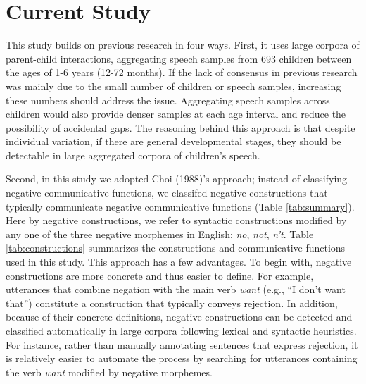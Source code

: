 \documentclass[
  man,floatsintext]{apa6}
\begin{document}
\hypertarget{current-study}{%
\section{Current Study}\label{current-study}}

This study builds on previous research in four ways. First, it uses large corpora of parent-child interactions, aggregating speech samples from 693 children between the ages of 1-6 years (12-72 months). If the lack of consensus in previous research was mainly due to the small number of children or speech samples, increasing these numbers should address the issue. Aggregating speech samples across children would also provide denser samples at each age interval and reduce the possibility of accidental gaps. The reasoning behind this approach is that despite individual variation, if there are general developmental stages, they should be detectable in large aggregated corpora of children's speech.

Second, in this study we adopted Choi (1988)'s approach; instead of classifying negative communicative functions, we classifed negative constructions that typically communicate negative communicative functions (Table \ref{tab:summary}). Here by negative constructions, we refer to syntactic constructions modified by any one of the three negative morphemes in English: \emph{no}, \emph{not}, \emph{n't}. Table \ref{tab:constructions} summarizes the constructions and communicative functions used in this study. This approach has a few advantages. To begin with, negative constructions are more concrete and thus easier to define. For example, utterances that combine negation with the main verb \emph{want} (e.g., ``I don't want that'') constitute a construction that typically conveys rejection. In addition, because of their concrete definitions, negative constructions can be detected and classified automatically in large corpora following lexical and syntactic heuristics. For instance, rather than manually annotating sentences that express rejection, it is relatively easier to automate the process by searching for utterances containing the verb \emph{want} modified by negative morphemes.
\end{document}

